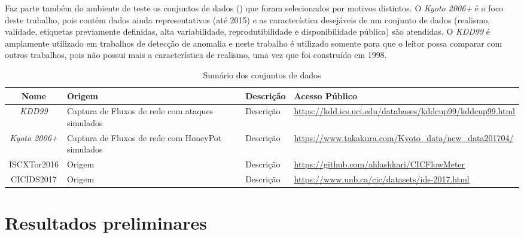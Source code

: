 Faz parte também do ambiente de teste os conjuntos de dados (\datasets)
que foram selecionados por motivos distintos.
O \dataset \emph{Kyoto 2006+} é o foco deste trabalho, pois contém dados ainda
representativos (até 2015) e as característica desejáveis de um conjunto de dados
(realismo, validade, etiquetas previamente definidas, alta variabilidade,
reprodutibilidade e disponibilidade pública) são atendidas.
O \dataset \emph{KDD99} é amplamente utilizado em trabalhos de detecção de
anomalia e neste trabalho é utilizado somente para que o leitor possa comparar com outros
trabalhos, pois não possui mais a característica de realismo, uma vez que foi
construído em 1998.

\begin{table}[ht]
  \caption{Sumário dos conjuntos de dados}
  \centering
  \begin{scriptsize}
  \begin{tabularx}{\linewidth}{c|X|X|X}
    Nome &
      Origem &
      Descrição &
      Acesso Público \\
    \hline
    \hline
    \emph{KDD99} &
      Captura de Fluxos de rede com ataques simulados &
      Descrição &
      \url{https://kdd.ics.uci.edu/databases/kddcup99/kddcup99.html} \\
    \hline
    \emph{Kyoto 2006+} &
      Captura de Fluxos de rede com HoneyPot simulados &
      Descrição &
      \url{https://www.takakura.com/Kyoto_data/new_data201704/} \\
    \hline
    ISCXTor2016 &
      Origem &
      Descrição &
      \url{https://github.com/ahlashkari/CICFlowMeter} \\
    \hline
    CICIDS2017 &
      Origem &
      Descrição &
      \url{https://www.unb.ca/cic/datasets/ids-2017.html} \\
    \hline
  \end{tabularx}
  \label{tab:summary-dataset}
  \end{scriptsize}
\end{table}

\section{Resultados preliminares}\label{sec:resultados}

